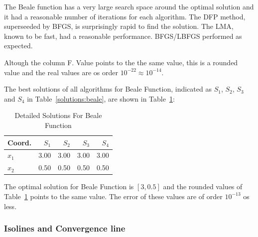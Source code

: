 \documentclass[conference]{IEEEtran}
\begin{document}
The Beale function has a very large search space around the optimal solution and
it had a reasonable number of iterations for each algorithm. The DFP method, superseeded by BFGS,
is surprisingly rapid to find the solution. The LMA, known to be fast, had a reasonable performance.
BFGS/LBFGS performed as expected.

Altough the column F. Value points to the the same value, this is a rounded value
and the real values are os order $10^{-22} \approx 10^{-14}$.


The best solutions of all algorithms for Beale Function, indicated as
$S_{1}$, $S_{2}$, $S_{3}$ and $S_{4}$ in Table~\ref{solutions:beale}, are shown
in Table~\ref{detailedsolutions:beale}:

\begin{table}[H]
\centering
\caption{Detailed Solutions For Beale Function}
\label{detailedsolutions:beale}
\begin{tabular}{lrrrr}
\toprule
 Coord. &  $S_{1}$ &  $S_{2}$ &  $S_{3}$ &  $S_{4}$ \\
\midrule
$x_{1}$ &     3.00 &     3.00 &     3.00 &     3.00 \\
$x_{2}$ &     0.50 &     0.50 &     0.50 &     0.50 \\
\bottomrule
\end{tabular}
\end{table}

The optimal solution for Beale Function is $[3, 0.5]$ and the rounded values
of Table~\ref{detailedsolutions:beale} points to the same value. The error of
these values are of order $10^{-13}$ os less.



\subsubsection{Isolines and Convergence line}
\label{isolinesbeale2D}
\end{document}
